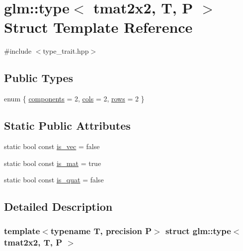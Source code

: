 \hypertarget{structglm_1_1type_3_01tmat2x2_00_01_t_00_01_p_01_4}{}\section{glm\+::type$<$ tmat2x2, T, P $>$ Struct Template Reference}
\label{structglm_1_1type_3_01tmat2x2_00_01_t_00_01_p_01_4}


{\ttfamily \#include $<$type\+\_\+trait.\+hpp$>$}

\subsection*{Public Types}
\begin{DoxyCompactItemize}
\item 
enum \{ \mbox{\hyperlink{structglm_1_1type_3_01tmat2x2_00_01_t_00_01_p_01_4_a750df447b95cac10ee7e9171f7c9d031a092f0a42c237f13710b4ad46eb4ef243}{components}} = 2, 
\mbox{\hyperlink{structglm_1_1type_3_01tmat2x2_00_01_t_00_01_p_01_4_a750df447b95cac10ee7e9171f7c9d031abfa4bdc88910b5a8430df5696b66d7f1}{cols}} = 2, 
\mbox{\hyperlink{structglm_1_1type_3_01tmat2x2_00_01_t_00_01_p_01_4_a750df447b95cac10ee7e9171f7c9d031a08a3a564cfe1f1759629bbe94897c0b7}{rows}} = 2
 \}
\end{DoxyCompactItemize}
\subsection*{Static Public Attributes}
\begin{DoxyCompactItemize}
\item 
static bool const \mbox{\hyperlink{structglm_1_1type_3_01tmat2x2_00_01_t_00_01_p_01_4_a4ae662052764bbc11115ab73fac7b053}{is\+\_\+vec}} = false
\item 
static bool const \mbox{\hyperlink{structglm_1_1type_3_01tmat2x2_00_01_t_00_01_p_01_4_ad4cab148bf9dfc3590df0d54c0b91841}{is\+\_\+mat}} = true
\item 
static bool const \mbox{\hyperlink{structglm_1_1type_3_01tmat2x2_00_01_t_00_01_p_01_4_adc925aea1a0a8eb2b8b59c5a78329d4c}{is\+\_\+quat}} = false
\end{DoxyCompactItemize}


\subsection{Detailed Description}
\subsubsection*{template$<$typename T, precision P$>$\newline
struct glm\+::type$<$ tmat2x2, T, P $>$}



